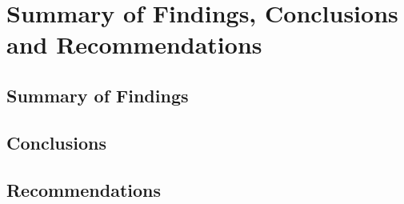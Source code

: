 \documentclass[../main]{subfiles}
\begin{document}
\chapter{Summary of Findings, Conclusions and Recommendations}

\section{Summary of Findings}

\section{Conclusions}

\section{Recommendations}
\end{document}
